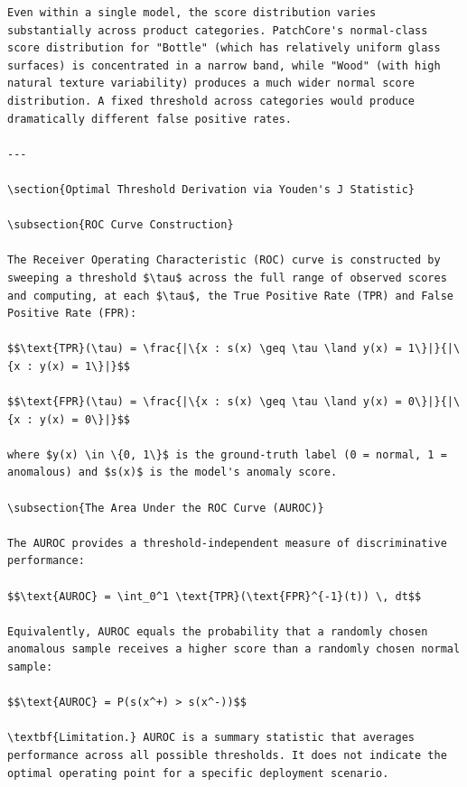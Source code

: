 \documentclass[12pt,a4paper,oneside]{report}
\begin{document}
\begin{verbatim}
Even within a single model, the score distribution varies substantially across product categories. PatchCore's normal-class score distribution for "Bottle" (which has relatively uniform glass surfaces) is concentrated in a narrow band, while "Wood" (with high natural texture variability) produces a much wider normal score distribution. A fixed threshold across categories would produce dramatically different false positive rates.

---

\section{Optimal Threshold Derivation via Youden's J Statistic}

\subsection{ROC Curve Construction}

The Receiver Operating Characteristic (ROC) curve is constructed by sweeping a threshold $\tau$ across the full range of observed scores and computing, at each $\tau$, the True Positive Rate (TPR) and False Positive Rate (FPR):

$$\text{TPR}(\tau) = \frac{|\{x : s(x) \geq \tau \land y(x) = 1\}|}{|\{x : y(x) = 1\}|}$$

$$\text{FPR}(\tau) = \frac{|\{x : s(x) \geq \tau \land y(x) = 0\}|}{|\{x : y(x) = 0\}|}$$

where $y(x) \in \{0, 1\}$ is the ground-truth label (0 = normal, 1 = anomalous) and $s(x)$ is the model's anomaly score.

\subsection{The Area Under the ROC Curve (AUROC)}

The AUROC provides a threshold-independent measure of discriminative performance:

$$\text{AUROC} = \int_0^1 \text{TPR}(\text{FPR}^{-1}(t)) \, dt$$

Equivalently, AUROC equals the probability that a randomly chosen anomalous sample receives a higher score than a randomly chosen normal sample:

$$\text{AUROC} = P(s(x^+) > s(x^-))$$

\textbf{Limitation.} AUROC is a summary statistic that averages performance across all possible thresholds. It does not indicate the optimal operating point for a specific deployment scenario.


\end{verbatim}
\end{document}
